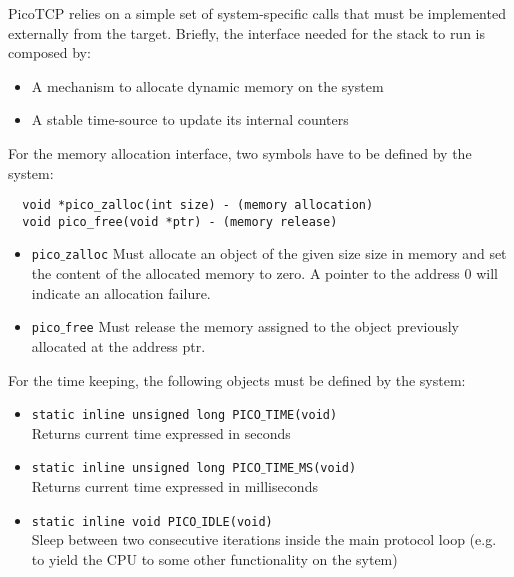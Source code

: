 PicoTCP relies on a simple set of system-specific calls that must be
implemented externally from the target. Briefly, the interface needed for
the stack to run is composed by:
\begin{itemize}
\item A mechanism to allocate dynamic memory on the system
\item A stable time-source to update its internal counters
\end{itemize} 

For the memory allocation interface, two symbols have to be defined by the system:
\begin{verbatim}
  void *pico_zalloc(int size) - (memory allocation) 
  void pico_free(void *ptr) - (memory release)
\end{verbatim}

\begin{itemize}
\item \texttt{pico$\_$zalloc} Must allocate an object of the given size size in memory
and set the content of the allocated memory to zero. A pointer to the address 0 will
indicate an allocation failure.
\item \texttt{pico$\_$free} Must release the memory assigned to the object previously
allocated at the address ptr.
\end{itemize}


For the time keeping, the following objects must be defined by the system:
\begin{itemize}%
\item
\texttt{static inline unsigned long PICO$\_$TIME(void)}\\
Returns current time expressed in seconds

\item
\texttt{static inline unsigned long PICO$\_$TIME$\_$MS(void)}\\
Returns current time expressed in milliseconds

\item
\texttt{static inline void PICO$\_$IDLE(void)}\\
Sleep between two consecutive iterations inside the main protocol loop
(e.g. to yield the CPU to some other functionality on the sytem)
\end{itemize}

